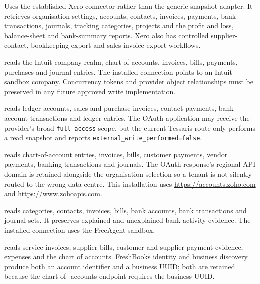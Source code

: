 \begin{description}[leftmargin=0pt,style=nextline]
  \item[Xero]
  Uses the established Xero connector rather than the generic snapshot adapter.
  It retrieves organisation settings, accounts, contacts, invoices, payments,
  bank transactions, journals, tracking categories, projects and the profit and
  loss, balance-sheet and bank-summary reports.  Xero also has controlled
  supplier-contact, bookkeeping-export and sales-invoice-export workflows.

  \item[QuickBooks Online]
   reads the Intuit company realm,
  chart of accounts, invoices, bills, payments, purchases and journal entries.
  The installed connection points to an Intuit sandbox company.  Concurrency
  tokens and provider object relationships must be preserved in any future
  approved write implementation.

  \item[Sage Business Cloud Accounting]
   reads ledger accounts, sales and purchase
  invoices, contact payments, bank-account transactions and ledger entries.
  The OAuth application may receive the provider's broad
  \texttt{full\_access} scope, but the current Tessaris route only performs a
  read snapshot and reports \texttt{external\_write\_performed=false}.

  \item[Zoho Books]
   reads chart-of-account entries,
  invoices, bills, customer payments, vendor payments, banking transactions and
  journals.  The OAuth response's regional API domain is retained alongside the
  organisation selection so a tenant is not silently routed to the wrong data
  centre.  This installation uses \url{https://accounts.zoho.com} and
  \url{https://www.zohoapis.com}.

  \item[FreeAgent]
   reads categories, contacts, invoices,
  bills, bank accounts, bank transactions and journal sets.  It preserves
  explained and unexplained bank-activity evidence.  The installed connection
  uses the FreeAgent sandbox.

  \item[FreshBooks]
   reads service invoices, supplier
  bills, customer and supplier payment evidence, expenses and the chart of
  accounts.  FreshBooks identity and business discovery produce both an account
  identifier and a business UUID; both are retained because the chart-of-
  accounts endpoint requires the business UUID.
\end{description}


